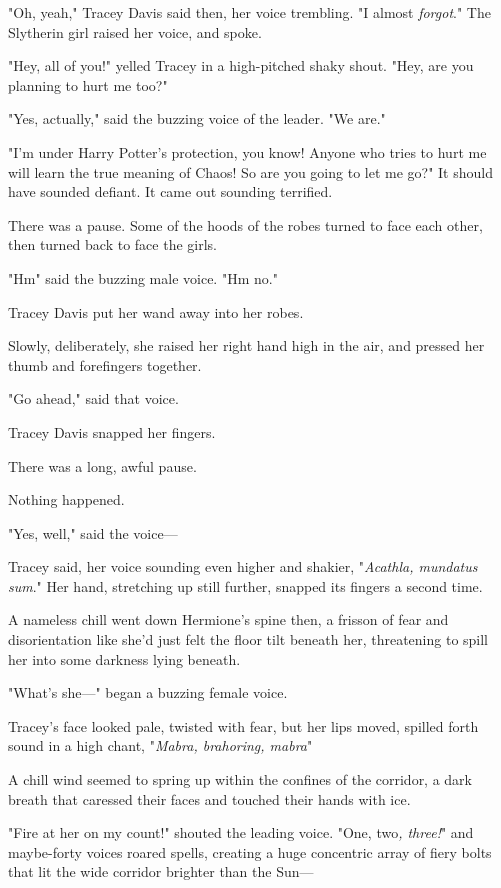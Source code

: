"Oh, yeah," Tracey Davis said then, her voice trembling. "I almost
\emph{forgot}." The Slytherin girl raised her voice, and spoke.

"Hey, all of you!" yelled Tracey in a high-pitched shaky shout. "Hey, are you
planning to hurt me too?"

"Yes, actually," said the buzzing voice of the leader. "We are."

"I'm under Harry Potter's protection, you know! Anyone who tries to hurt me
will learn the true meaning of Chaos! So are you going to let me go?" It should
have sounded defiant. It came out sounding terrified.

There was a pause. Some of the hoods of the robes turned to face each other,
then turned back to face the girls.

"Hm{\el}" said the buzzing male voice. "Hm{\el} no."

Tracey Davis put her wand away into her robes.

Slowly, deliberately, she raised her right hand high in the air, and pressed
her thumb and forefingers together.

"Go ahead," said that voice.

Tracey Davis snapped her fingers.

There was a long, awful pause.

Nothing happened.

"Yes, well," said the voice---

Tracey said, her voice sounding even higher and shakier, "\emph{Acathla,
mundatus sum}." Her hand, stretching up still further, snapped its fingers a
second time.

A nameless chill went down Hermione's spine then, a frisson of fear and
disorientation like she'd just felt the floor tilt beneath her, threatening to
spill her into some darkness lying beneath.

"What's she---" began a buzzing female voice.

Tracey's face looked pale, twisted with fear, but her lips moved, spilled forth
sound in a high chant, "\emph{Mabra, brahoring, mabra{\el}}"

A chill wind seemed to spring up within the confines of the corridor, a dark
breath that caressed their faces and touched their hands with ice.

"Fire at her on my count!" shouted the leading voice. "One, two\emph{, three!}"
and maybe-forty voices roared spells, creating a huge concentric array of fiery
bolts that lit the wide corridor brighter than the Sun---

